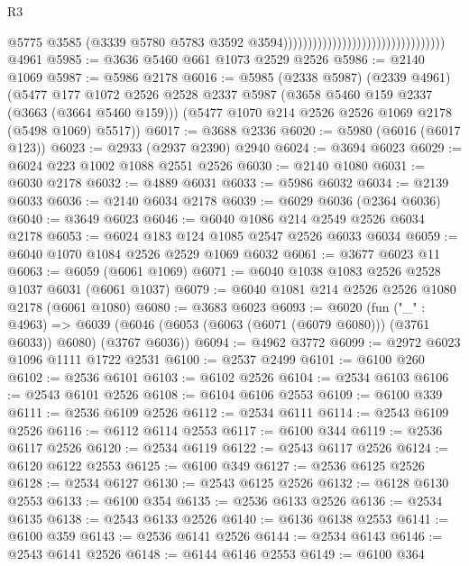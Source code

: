 \begin{lexlean}{R3}
\begin{coremodule}
                                                                    @5775
                                                                    @3585
                                                                    (@3339
                                                                      @5780
                                                                      @5783
                                                                      @3592
                                                                      @3594)))))))))))))))))))))))))))))))))
    @4961
@5985 := @3636 @5460 @661 @1073 @2529 @2526
@5986 := @2140 @1069
@5987 := @5986 @2178
@6016 := @5985
    (@2338 @5987)
    (@2339 @4961)
    (@5477
      @177
      @1072
      @2526
      @2528
      @2337
      @5987
      (@3658 @5460 @159 @2337 (@3663 (@3664 @5460 @159)))
      (@5477 @1070 @214 @2526 @2526 @1069 @2178 (@5498 @1069) @5517))
@6017 := @3688 @2336
@6020 := @5980 (@6016 (@6017 @123))
@6023 := @2933 (@2937 @2390) @2940
@6024 := @3694 @6023
@6029 := @6024 @223 @1002 @1088 @2551 @2526
@6030 := @2140 @1080
@6031 := @6030 @2178
@6032 := @4889 @6031
@6033 := @5986 @6032
@6034 := @2139 @6033
@6036 := @2140 @6034 @2178
@6039 := @6029 @6036 (@2364 @6036)
@6040 := @3649 @6023
@6046 := @6040 @1086 @214 @2549 @2526 @6034 @2178
@6053 := @6024 @183 @124 @1085 @2547 @2526 @6033 @6034
@6059 := @6040 @1070 @1084 @2526 @2529 @1069 @6032
@6061 := @3677 @6023 @11
@6063 := @6059 (@6061 @1069)
@6071 := @6040 @1038 @1083 @2526 @2528 @1037 @6031 (@6061 @1037)
@6079 := @6040 @1081 @214 @2526 @2526 @1080 @2178 (@6061 @1080)
@6080 := @3683 @6023
@6093 := @6020
    (fun ("_" : @4963) =>
    @6039 (@6046 (@6053 (@6063 (@6071 (@6079 @6080))) (@3761 @6033)) @6080) (@3767 @6036))
@6094 := @4962 @3772
@6099 := @2972 @6023 @1096 @1111 @1722 @2531
@6100 := @2537 @2499
@6101 := @6100 @260
@6102 := @2536 @6101
@6103 := @6102 @2526
@6104 := @2534 @6103
@6106 := @2543 @6101 @2526
@6108 := @6104 @6106 @2553
@6109 := @6100 @339
@6111 := @2536 @6109 @2526
@6112 := @2534 @6111
@6114 := @2543 @6109 @2526
@6116 := @6112 @6114 @2553
@6117 := @6100 @344
@6119 := @2536 @6117 @2526
@6120 := @2534 @6119
@6122 := @2543 @6117 @2526
@6124 := @6120 @6122 @2553
@6125 := @6100 @349
@6127 := @2536 @6125 @2526
@6128 := @2534 @6127
@6130 := @2543 @6125 @2526
@6132 := @6128 @6130 @2553
@6133 := @6100 @354
@6135 := @2536 @6133 @2526
@6136 := @2534 @6135
@6138 := @2543 @6133 @2526
@6140 := @6136 @6138 @2553
@6141 := @6100 @359
@6143 := @2536 @6141 @2526
@6144 := @2534 @6143
@6146 := @2543 @6141 @2526
@6148 := @6144 @6146 @2553
@6149 := @6100 @364

\end{coremodule}
\end{lexlean}
